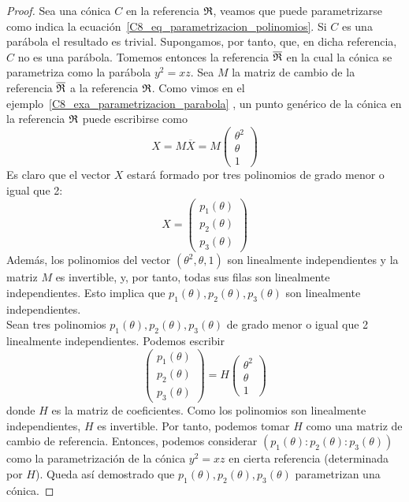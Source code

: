 \begin{proof}
	Sea una cónica $C$ en la referencia $\mathfrak{R}$, veamos que puede parametrizarse como indica la ecuación~\eqref{C8_eq_parametrizacion_polinomios}. Si $C$ es una parábola el resultado es trivial. Supongamos, por tanto, que, en dicha referencia, $C$ no es una parábola. Tomemos entonces la referencia $\overline{\mathfrak{R}}$ en la cual la cónica se parametriza como la parábola $y^2=xz$. Sea $M$ la matriz de cambio de la referencia $\overline{\mathfrak{R}}$ a la referencia $\mathfrak{R}$. Como vimos en el ejemplo~\ref{C8_exa_parametrizacion_parabola} , un punto genérico de la cónica en la referencia $\mathfrak{R}$ puede escribirse como
	\begin{equation}
		X=M\overline{X}=M
		\left( \begin{array}{c}
		\theta^2\\\theta\\1
		\end{array}\right)
	\end{equation}
	Es claro que el vector $X$ estará formado por tres polinomios de grado menor o igual que 2:
	\[X=\left( \begin{array}{c}
	p_1(\theta)\\p_2(\theta)\\p_3(\theta)
	\end{array}\right)\]
	Además, los polinomios del vector $(\theta^2,\theta,1)$ son linealmente independientes y la matriz $M$ es invertible, y, por tanto, todas sus filas son linealmente independientes. Esto implica que $p_1(\theta),p_2(\theta),p_3(\theta)$ son linealmente independientes.\\
	
	Sean tres polinomios $p_1(\theta),p_2(\theta),p_3(\theta)$ de grado menor o igual que 2 linealmente independientes. Podemos escribir
	\begin{equation*}
		\left( \begin{array}{c}
		p_1(\theta)\\p_2(\theta)\\p_3(\theta)
		\end{array}\right)=H
		\left( \begin{array}{c}
		\theta^2\\\theta\\1
	\end{array}\right)
	\end{equation*}
	donde $H$ es la matriz de coeficientes. Como los polinomios son linealmente independientes, $H$ es invertible. Por tanto, podemos tomar $H$ como una matriz de cambio de referencia. Entonces, podemos considerar $(p_1(\theta):p_2(\theta):p_3(\theta))$ como la parametrización de la cónica $y^2=xz$ en cierta referencia (determinada por $H$). Queda así demostrado que
	$p_1(\theta),p_2(\theta),p_3(\theta)$ parametrizan una cónica.
\end{proof}
